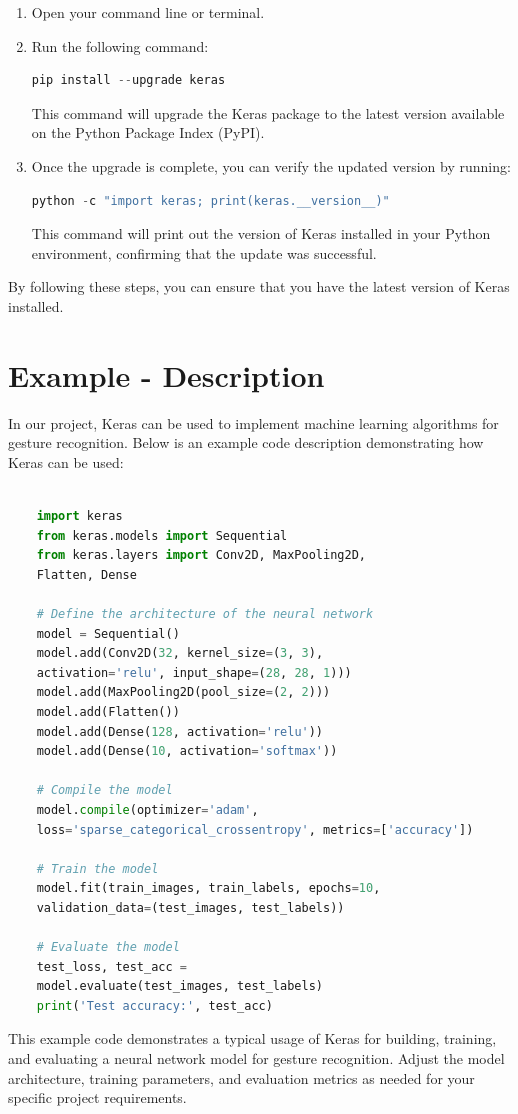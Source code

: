 \begin{enumerate}
	\item Open your command line or terminal.
	\item Run the following command:
	
	
	
	\begin{lstlisting}[language=python]
		pip install --upgrade keras
	\end{lstlisting}
	
	
	This command will upgrade the Keras package to the latest version available on the Python Package Index (PyPI).
	
	\item Once the upgrade is complete, you can verify the updated version by running:
	
	\begin{lstlisting}[language=python]
		python -c "import keras; print(keras.__version__)"
	\end{lstlisting}
	
	
	This command will print out the version of Keras installed in your Python environment, confirming that the update was successful.
\end{enumerate}

By following these steps, you can ensure that you have the latest version of Keras installed.\cite{Lak:2023}


\section{Example - Description}

	In our project, Keras can be used to implement machine learning algorithms for gesture recognition. Below is an example code description demonstrating how Keras can be used:
	\begin{lstlisting}[language=Python]

	import keras
	from keras.models import Sequential
	from keras.layers import Conv2D, MaxPooling2D, 
	Flatten, Dense
	
	# Define the architecture of the neural network
	model = Sequential()
	model.add(Conv2D(32, kernel_size=(3, 3), 
	activation='relu', input_shape=(28, 28, 1)))
	model.add(MaxPooling2D(pool_size=(2, 2)))
	model.add(Flatten())
	model.add(Dense(128, activation='relu'))
	model.add(Dense(10, activation='softmax'))
	
	# Compile the model
	model.compile(optimizer='adam', 
	loss='sparse_categorical_crossentropy', metrics=['accuracy'])
	
	# Train the model
	model.fit(train_images, train_labels, epochs=10,
	validation_data=(test_images, test_labels))
	
	# Evaluate the model
	test_loss, test_acc = 
	model.evaluate(test_images, test_labels)
	print('Test accuracy:', test_acc)

	\end{lstlisting}
This example code demonstrates a typical usage of Keras for building, training, and evaluating a neural network model for gesture recognition. Adjust the model architecture, training parameters, and evaluation metrics as needed for your specific project requirements.


